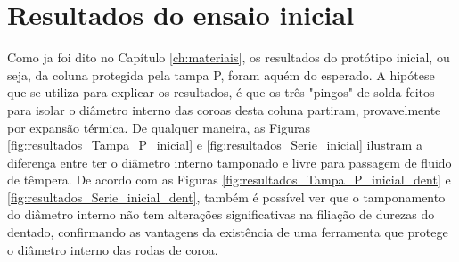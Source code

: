 \section{Resultados do ensaio inicial} \label{sec:resultados_ensaio_inicial}
Como ja foi dito no Capítulo \ref{ch:materiais}, os resultados do protótipo inicial, ou seja, da coluna protegida pela tampa P, foram aquém do esperado. A hipótese que se utiliza para explicar os resultados, é que os três "pingos" de solda feitos para isolar o diâmetro interno das coroas desta coluna partiram, provavelmente por expansão térmica. De qualquer maneira, as Figuras \ref{fig:resultados_Tampa_P_inicial} e \ref{fig:resultados_Serie_inicial} ilustram a diferença entre ter o diâmetro interno tamponado e livre para passagem de fluido de têmpera. De acordo com as Figuras \ref{fig:resultados_Tampa_P_inicial_dent} e \ref{fig:resultados_Serie_inicial_dent}, também é possível ver que o tamponamento do diâmetro interno não tem alterações significativas na filiação de durezas do dentado, confirmando as vantagens da existência de uma ferramenta que protege o diâmetro interno das rodas de coroa.
